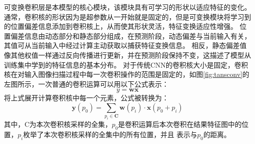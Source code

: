 可变换卷积层是本模型的核心模块，该模块具有可学习的形状以适应特征的变化。 
通常，卷积核的形状因为是超参数从一开始就是固定的，但是可变换模块将学习到的位置偏差信息添加到卷积核上，从而使其形状灵活，特征变换适应性增强。 
位置偏差信息由动态部分和静态部分组成，在预测阶段，动态偏差与当前输入有关，其值可从当前输入中经过计算主动获取以捕获特征变换信息。 
相反，静态偏差值像其他权值一样通过反向传播进行更新，并在预测阶段保持不变，这描述了模型从训练集中学到的特征信息的基本分布。
对于传统CNN的卷积核大小是固定，卷积核在对输入图像扫描过程中每一次卷积操作的范围是固定的，如图\ref{fig:tansconv}的左图所示，一次普通的卷积运算可以用以下公式表示：
\begin{equation}
  y=\mathbf{w}\mathbf{x}
  \end{equation}
  将上式展开计算卷积核中每一个元素，公式被转换为：
  \begin{equation}
    \mathbf{y}\left(p_{0}\right)=\sum_{p_{i} \in \mathbf{C}} \mathbf{w}\left(p_{i}\right) \cdot \mathbf{x}\left(p_{0}+p_{i}\right)
    \end{equation}
其中，C为本次卷积核采样的全集，$p_{0}$是卷积运算后本次卷积在结果特征图中的位置，$p_{i}$枚举了本次卷积核采样的全集中的所有位置，并且
表示与$p_{0}$的距离。

